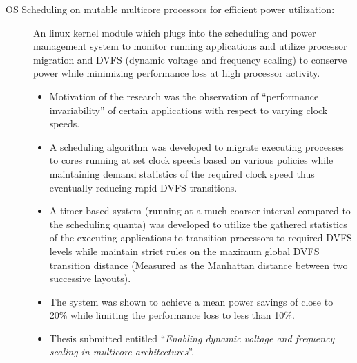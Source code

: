 \begin{description}
\item[OS Scheduling on mutable multicore processors for efficient power utilization:] An linux kernel module which plugs into the scheduling and power management system to monitor running applications and utilize processor migration and DVFS (dynamic voltage and frequency scaling) to conserve power while minimizing performance loss at high processor activity.
\begin{itemize}
\item Motivation of the research was the observation of ``performance invariability'' of certain applications with respect to varying clock speeds.
\item A scheduling algorithm was developed to migrate executing processes to cores running at set clock speeds based on various policies while maintaining demand statistics of the required clock speed thus eventually reducing rapid DVFS transitions.
\item A timer based system (running at a much coarser interval compared to the scheduling quanta) was developed to utilize the gathered statistics of the executing applications to transition processors to required DVFS levels while maintain strict rules on the maximum global DVFS transition distance (Measured as the Manhattan distance between two successive layouts).
\item The system was shown to achieve a mean power savings of close to 20\% while limiting the performance loss to less than 10\%.
\item Thesis submitted entitled ``\textit{Enabling dynamic voltage and frequency scaling in multicore architectures}''.
\end{itemize}




\end{description}
